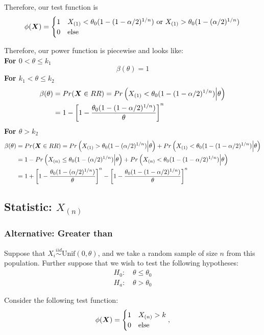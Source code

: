 \documentclass[]{article}
\newcommand{\bfX}{\mbox{\boldmath $X$}}
\begin{document}
Therefore, our test function is
\[
\phi(\bfX) = \begin{cases}
1 & X_{(1)} < \theta_0(1 - (1 - \alpha/2)^{1/n}) \text{ or } X_{(1)} >  \theta_0(1 - (\alpha/2)^{1/n}) \\
0 & \text{else}
\end{cases}
\]

Therefore, our power function is piecewise and looks like:\\
\textbf{For $0 < \theta \leq k_1$}
\[
\beta(\theta) = 1
\]
\textbf{For $k_1 < \theta \leq k_2$}
\[
\begin{split}
\beta(\theta) &= Pr(\bfX \in RR) = Pr\left(X_{(1)} < \theta_0(1 - (1 - \alpha/2)^{1/n}) \Big| \theta\right) \\
&= 1 - \left[1 - \frac{\theta_0(1 - (1 - \alpha/2)^{1/n}) }{\theta}\right]^n
\end{split}
\]
\textbf{For $\theta > k_2$}
\[
\begin{split}
\beta(\theta) &= Pr(\bfX \in RR) = Pr\left(X_{(1)} > \theta_0(1 - (\alpha/2)^{1/n}) \Big| \theta\right) + Pr\left(X_{(1)} < \theta_0(1 - (1 - \alpha/2)^{1/n}) \Big| \theta\right) \\
&= 1 - Pr\left(X_{(n)}\leq  \theta_0(1 - (\alpha/2)^{1/n}) \Big| \theta\right) + Pr\left(X_{(n)} < \theta_0(1 - (1 - \alpha/2)^{1/n}) \Big| \theta\right) \\
&= 1 + \left[1 - \frac{\theta_0(1 - (\alpha/2)^{1/n})}{\theta}\right]^n - \left[1 - \frac{\theta_0(1 - (1 - \alpha/2)^{1/n})}{\theta}\right]^n
\end{split}
\]

\subsection{Statistic: $X_{(n)}$}

\subsubsection{Alternative: Greater than}

Suppose that $X_i \stackrel{iid}{\sim} \text{Unif}(0, \theta)$, and we take a random sample of size $n$ from this population. Further suppose that we wish to test the following hypotheses:
\[
\begin{split}
\text{$H_0$: }& \theta \leq \theta_0 \\
\text{$H_a$: }& \theta > \theta_0
\end{split}
\]

Consider the following test function:
\[
\phi(\bfX) = \begin{cases}
1 & X_{(n)} > k \\
0 & \text{else}
\end{cases},
\]
\end{document}
